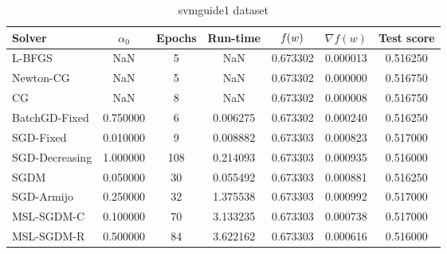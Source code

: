 \begin{table}
\caption{svmguide1 dataset}
\label{tab:svm-tab}
\centering
\begin{tabular}{lS[round-precision=3]S[drop-zero-decimal]S[round-precision=4]S[round-precision=6]S[exponent-mode=scientific]S[round-precision=6]}
\toprule
Solver & {$\alpha_0$} & {Epochs} & {Run-time} & {$\operatorname*{\mathit{f}}(w)$} & {$\nabla f(w)$} & {Test score} \\
\midrule
L-BFGS & NaN & 5 & NaN & 0.673302 & 0.000013 & 0.516250 \\
Newton-CG & NaN & 5 & NaN & 0.673302 & 0.000000 & 0.516750 \\
CG & NaN & 8 & NaN & 0.673302 & 0.000008 & 0.516750 \\
BatchGD-Fixed & 0.750000 & 6 & 0.006275 & 0.673302 & 0.000240 & 0.516250 \\
SGD-Fixed & 0.010000 & 9 & 0.008882 & 0.673303 & 0.000823 & 0.517000 \\
SGD-Decreasing & 1.000000 & 108 & 0.214093 & 0.673303 & 0.000935 & 0.516000 \\
SGDM & 0.050000 & 30 & 0.055492 & 0.673303 & 0.000881 & 0.516250 \\
SGD-Armijo & 0.250000 & 32 & 1.375538 & 0.673303 & 0.000992 & 0.517000 \\
MSL-SGDM-C & 0.100000 & 70 & 3.133235 & 0.673303 & 0.000738 & 0.517000 \\
MSL-SGDM-R & 0.500000 & 84 & 3.622162 & 0.673303 & 0.000616 & 0.516000 \\
\bottomrule
\end{tabular}
\end{table}



